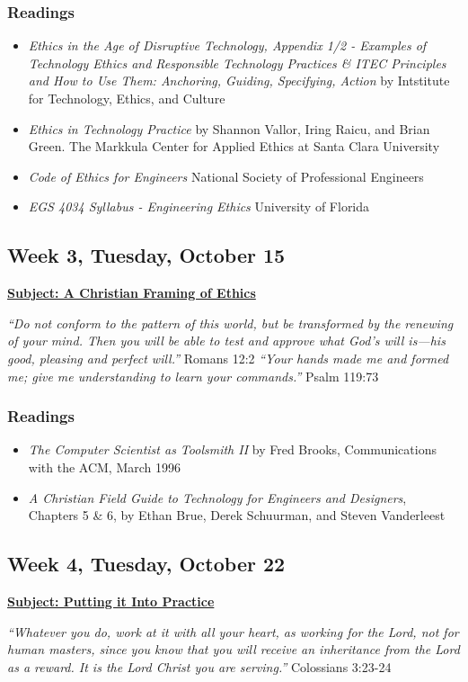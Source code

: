 \documentclass[12pt]{article}
\begin{document}
\subsubsection*{Readings}
\label{sec:org6f796b7}
\begin{itemize}
\item \emph{Ethics in the Age of Disruptive Technology, Appendix 1/2 - Examples of
Technology Ethics and Responsible Technology Practices \& ITEC Principles and
How to Use Them: Anchoring, Guiding, Specifying, Action} by Intstitute for
Technology, Ethics, and Culture
\item \emph{Ethics in Technology Practice} by Shannon Vallor, Iring Raicu, and Brian
Green. The Markkula Center for Applied Ethics at Santa Clara University
\item \emph{Code of Ethics for Engineers} National Society of Professional Engineers
\item \emph{EGS 4034 Syllabus - Engineering Ethics} University of Florida
\end{itemize}
\subsection*{Week 3, Tuesday, October 15}
\label{sec:org53b2277}
\textbf{\uline{Subject: A Christian Framing of Ethics}}
\begin{mdframed}[nobreak=true]
\emph{``Do not conform to the pattern of this world, but be transformed by the
renewing of your mind. Then you will be able to test and approve what God’s will
is—his good, pleasing and perfect will.''} Romans 12:2 \newline
\noindent \emph{``Your hands made me and formed me; give me understanding to
learn your commands.''} Psalm 119:73
\end{mdframed}
\subsubsection*{Readings}
\label{sec:org105be41}
\begin{itemize}
\item \emph{The Computer Scientist as Toolsmith II} by Fred Brooks, Communications with
the ACM, March 1996
\item \emph{A Christian Field Guide to Technology for Engineers and Designers}, Chapters
5 \& 6, by Ethan Brue, Derek Schuurman, and Steven Vanderleest
\end{itemize}
\subsection*{Week 4, Tuesday, October 22}
\label{sec:org54be782}
\textbf{\uline{Subject: Putting it Into Practice}}
\begin{mdframed}[nobreak=true]
\emph{``Whatever you do, work at it with all your heart, as working for the Lord, not
for human masters, since you know that you will receive an inheritance from the
Lord as a reward. It is the Lord Christ you are serving.''} Colossians 3:23-24
\end{mdframed}
\end{document}
